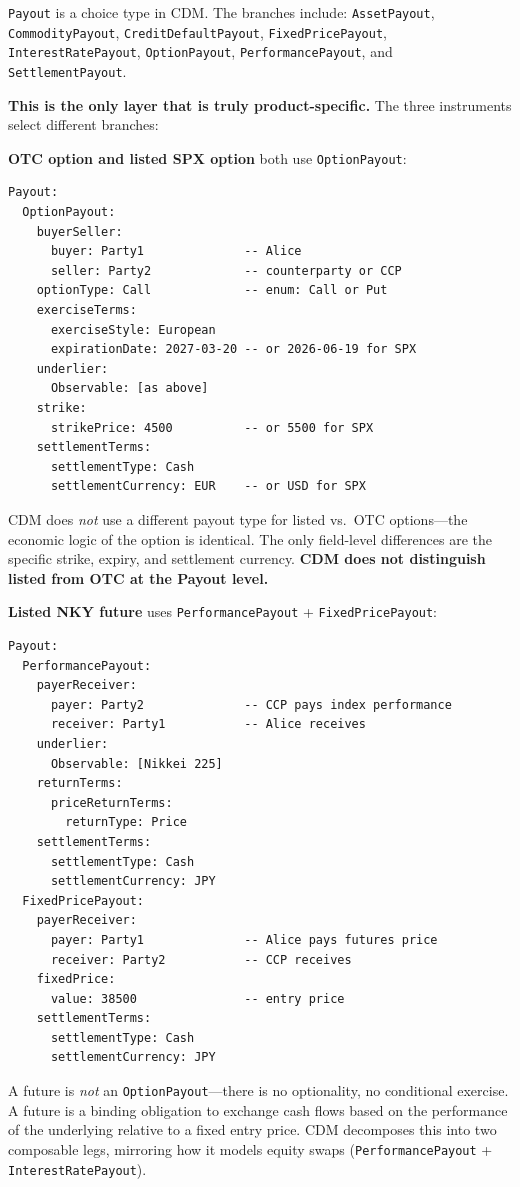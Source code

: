 \documentclass[11pt,a4paper]{article}
\begin{document}
\texttt{Payout} is a choice type in CDM. The branches include: \texttt{AssetPayout}, \texttt{CommodityPayout}, \texttt{CreditDefaultPayout}, \texttt{FixedPricePayout}, \texttt{InterestRatePayout}, \texttt{OptionPayout}, \texttt{PerformancePayout}, and \texttt{SettlementPayout}.

\textbf{This is the only layer that is truly product-specific.} The three instruments select different branches:

\medskip
\noindent\textbf{OTC option and listed SPX option} both use \texttt{OptionPayout}:
\begin{lstlisting}
Payout:
  OptionPayout:
    buyerSeller:
      buyer: Party1              -- Alice
      seller: Party2             -- counterparty or CCP
    optionType: Call             -- enum: Call or Put
    exerciseTerms:
      exerciseStyle: European
      expirationDate: 2027-03-20 -- or 2026-06-19 for SPX
    underlier:
      Observable: [as above]
    strike:
      strikePrice: 4500          -- or 5500 for SPX
    settlementTerms:
      settlementType: Cash
      settlementCurrency: EUR    -- or USD for SPX
\end{lstlisting}

\noindent CDM does \emph{not} use a different payout type for listed vs.\ OTC options---the economic logic of the option is identical. The only field-level differences are the specific strike, expiry, and settlement currency. \textbf{CDM does not distinguish listed from OTC at the Payout level.}

\medskip
\noindent\textbf{Listed NKY future} uses \texttt{PerformancePayout} + \texttt{FixedPricePayout}:
\begin{lstlisting}
Payout:
  PerformancePayout:
    payerReceiver:
      payer: Party2              -- CCP pays index performance
      receiver: Party1           -- Alice receives
    underlier:
      Observable: [Nikkei 225]
    returnTerms:
      priceReturnTerms:
        returnType: Price
    settlementTerms:
      settlementType: Cash
      settlementCurrency: JPY
  FixedPricePayout:
    payerReceiver:
      payer: Party1              -- Alice pays futures price
      receiver: Party2           -- CCP receives
    fixedPrice:
      value: 38500               -- entry price
    settlementTerms:
      settlementType: Cash
      settlementCurrency: JPY
\end{lstlisting}

\noindent A future is \emph{not} an \texttt{OptionPayout}---there is no optionality, no conditional exercise. A future is a binding obligation to exchange cash flows based on the performance of the underlying relative to a fixed entry price. CDM decomposes this into two composable legs, mirroring how it models equity swaps (\texttt{PerformancePayout} + \texttt{InterestRatePayout}).
\end{document}
